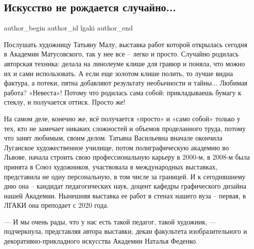  
 
 
 
 
 
\subsection{Искусство не рождается случайно...}
\label{sec:15_02_2022.stz.edu.lnr.lgaki.1.isskustvo_tatjana_mala}
 
\ifcmt
 author_begin
   author_id lgaki
 author_end
\fi

Послушать художницу Татьяну Малу, выставка работ которой открылась сегодня в
Академии Матусовского, так у нее все – легко и просто. Случайно родилась
авторская техника: делала на линолеуме клише для гравюр и поняла, что можно их
и сами использовать. А если еще золотом клише полить, то лучше видна фактура, а
потеки, пятна добавляют результату необычности и тайны... Любимая работа?
«Невеста»! Потому что родилась сама собой: прикладываешь бумагу к стеклу, и
получается оттиск. Просто же!


На самом деле, конечно же, всё получается «просто» и «само собой» только у тех,
кто не замечает никаких сложностей и объемов проделанного труда, потому что
занят любимым, своим делом. Татьяна Васильевна вначале окончила Луганское
художественное училище, потом полиграфическую академию во Львове, начала
строить свою профессиональную карьеру в 2000-м, в 2008-м была принята в Союз
художников, участвовала в международных выставках, представила не одну
персональную, в том числе за границей. И к сегодняшнему дню она – кандидат
педагогических наук, доцент кафедры графического дизайна нашей Академии.
Нынешняя выставка ее работ в стенах нашего вуза – первая, в ЛГАКИ она преподает
с 2020 года.


— И мы очень рады, что у нас есть такой педагог, такой художник, — подчеркнула,
представляя автора выставки, декан факультета изобразительного и
декоративно-прикладного искусства Академии Наталья Феденко.

